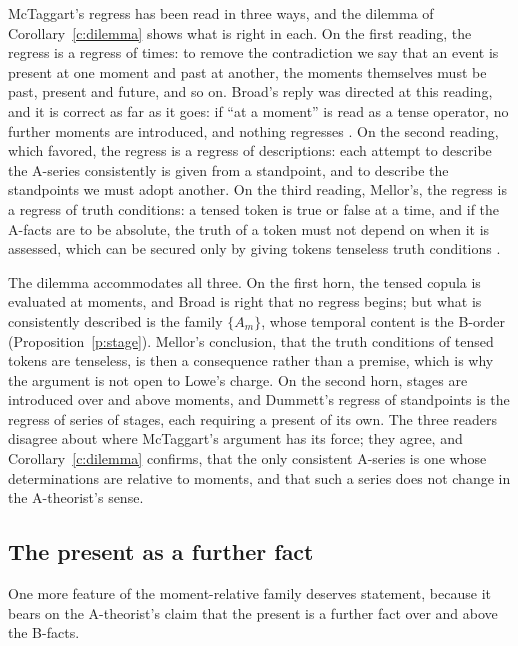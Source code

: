 \documentclass{situationist-preprint}
\begin{document}
McTaggart's regress has been read in three ways, and the dilemma of Corollary~\ref{c:dilemma} shows what is right in each. On the first reading, the regress is a regress of times: to remove the contradiction we say that an event is present at one moment and past at another, the moments themselves must be past, present and future, and so on. Broad's reply was directed at this reading, and it is correct as far as it goes: if \enquote{at a moment} is read as a tense operator, no further moments are introduced, and nothing regresses \citep{Broad1938}. On the second reading, which \citet{Dummett1960} favored, the regress is a regress of descriptions: each attempt to describe the A-series consistently is given from a standpoint, and to describe the standpoints we must adopt another. On the third reading, Mellor's, the regress is a regress of truth conditions: a tensed token is true or false at a time, and if the A-facts are to be absolute, the truth of a token must not depend on when it is assessed, which can be secured only by giving tokens tenseless truth conditions \citep{Mellor1981,Mellor1998}.

The dilemma accommodates all three. On the first horn, the tensed copula is evaluated at moments, and Broad is right that no regress begins; but what is consistently described is the family $\{A_m\}$, whose temporal content is the B-order (Proposition~\ref{p:stage}). Mellor's conclusion, that the truth conditions of tensed tokens are tenseless, is then a consequence rather than a premise, which is why the argument is not open to Lowe's charge. On the second horn, stages are introduced over and above moments, and Dummett's regress of standpoints is the regress of series of stages, each requiring a present of its own. The three readers disagree about where McTaggart's argument has its force; they agree, and Corollary~\ref{c:dilemma} confirms, that the only consistent A-series is one whose determinations are relative to moments, and that such a series does not change in the A-theorist's sense.

\subsection{The present as a further fact}

One more feature of the moment-relative family deserves statement, because it bears on the A-theorist's claim that the present is a further fact over and above the B-facts.
\end{document}

